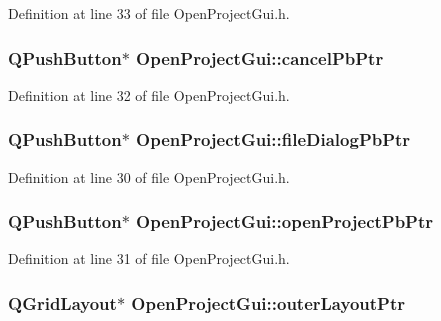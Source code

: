 Definition at line 33 of file Open\-Project\-Gui.\-h.

\hypertarget{class_open_project_gui_a9e9fc184375d14b4ed336470bc06ffb1}{
\subsubsection[{cancel\-Pb\-Ptr}]{\setlength{\rightskip}{0pt plus 5cm}Q\-Push\-Button$\ast$ Open\-Project\-Gui\-::cancel\-Pb\-Ptr\hspace{0.3cm}{\ttfamily [private]}}}\label{class_open_project_gui_a9e9fc184375d14b4ed336470bc06ffb1}


Definition at line 32 of file Open\-Project\-Gui.\-h.

\hypertarget{class_open_project_gui_affa5359b9b61f58f2b6681e5f0d0b243}{
\subsubsection[{file\-Dialog\-Pb\-Ptr}]{\setlength{\rightskip}{0pt plus 5cm}Q\-Push\-Button$\ast$ Open\-Project\-Gui\-::file\-Dialog\-Pb\-Ptr\hspace{0.3cm}{\ttfamily [private]}}}\label{class_open_project_gui_affa5359b9b61f58f2b6681e5f0d0b243}


Definition at line 30 of file Open\-Project\-Gui.\-h.

\hypertarget{class_open_project_gui_a4eeebb540cd48483c353106938c97ea3}{
\subsubsection[{open\-Project\-Pb\-Ptr}]{\setlength{\rightskip}{0pt plus 5cm}Q\-Push\-Button$\ast$ Open\-Project\-Gui\-::open\-Project\-Pb\-Ptr\hspace{0.3cm}{\ttfamily [private]}}}\label{class_open_project_gui_a4eeebb540cd48483c353106938c97ea3}


Definition at line 31 of file Open\-Project\-Gui.\-h.

\hypertarget{class_open_project_gui_ab83addd5cbd6d61872347b850c2d9981}{
\subsubsection[{outer\-Layout\-Ptr}]{\setlength{\rightskip}{0pt plus 5cm}Q\-Grid\-Layout$\ast$ Open\-Project\-Gui\-::outer\-Layout\-Ptr\hspace{0.3cm}{\ttfamily [private]}}}\label{class_open_project_gui_ab83addd5cbd6d61872347b850c2d9981}


